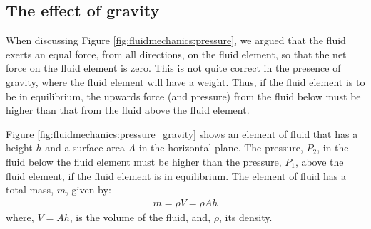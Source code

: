 \subsection{The effect of gravity}
When discussing Figure \ref{fig:fluidmechanics:pressure}, we argued that the fluid exerts an equal force, from all directions, on the fluid element, so that the net force on the fluid element is zero. This is not quite correct in the presence of gravity, where the fluid element will have a weight. Thus, if the fluid element is to be in equilibrium, the upwards force (and pressure) from the fluid below must be higher than that from the fluid above the fluid element. 

Figure \ref{fig:fluidmechanics:pressure_gravity} shows an element of fluid that has a height $h$ and a surface area $A$ in the horizontal plane. The pressure, $P_2$, in the fluid below the fluid element must be higher than the pressure, $P_1$, above the fluid element, if the fluid element is in equilibrium.
The element of fluid has a total mass, $m$, given by:
\begin{align*}
m = \rho V = \rho Ah
\end{align*}
where, $V=Ah$, is the volume of the fluid, and, $\rho$, its density.

